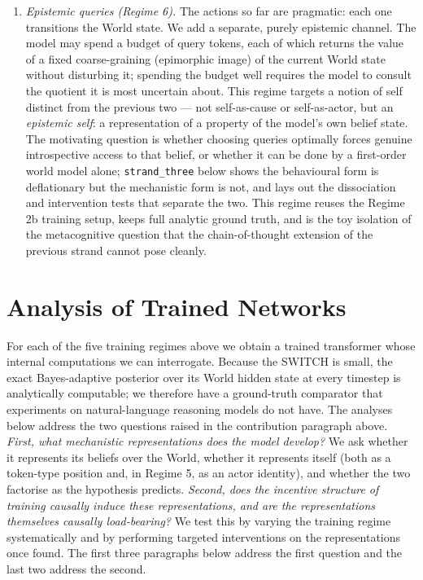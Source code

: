\documentclass[11pt]{article}
\begin{document}
\begin{enumerate}
    \item \emph{Epistemic queries (Regime 6).} The actions so far are pragmatic: each one transitions the World state. We add a separate, purely epistemic channel. The model may spend a budget of query tokens, each of which returns the value of a fixed coarse-graining (epimorphic image) of the current World state without disturbing it; spending the budget well requires the model to consult the quotient it is most uncertain about. This regime targets a notion of self distinct from the previous two --- not self-as-cause or self-as-actor, but an \emph{epistemic self}: a representation of a property of the model's own belief state. The motivating question is whether choosing queries optimally forces genuine introspective access to that belief, or whether it can be done by a first-order world model alone; \texttt{strand\_three} below shows the behavioural form is deflationary but the mechanistic form is not, and lays out the dissociation and intervention tests that separate the two. This regime reuses the Regime 2b training setup, keeps full analytic ground truth, and is the toy isolation of the metacognitive question that the chain-of-thought extension of the previous strand cannot pose cleanly.
\end{enumerate}

\section*{Analysis of Trained Networks}

For each of the five training regimes above we obtain a trained transformer whose internal computations we can interrogate. Because the SWITCH is small, the exact Bayes-adaptive posterior over its World hidden state at every timestep is analytically computable; we therefore have a ground-truth comparator that experiments on natural-language reasoning models do not have. The analyses below address the two questions raised in the contribution paragraph above. \emph{First, what mechanistic representations does the model develop?} We ask whether it represents its beliefs over the World, whether it represents itself (both as a token-type position and, in Regime 5, as an actor identity), and whether the two factorise as the hypothesis predicts. \emph{Second, does the incentive structure of training causally induce these representations, and are the representations themselves causally load-bearing?} We test this by varying the training regime systematically and by performing targeted interventions on the representations once found. The first three paragraphs below address the first question and the last two address the second.
\end{document}
